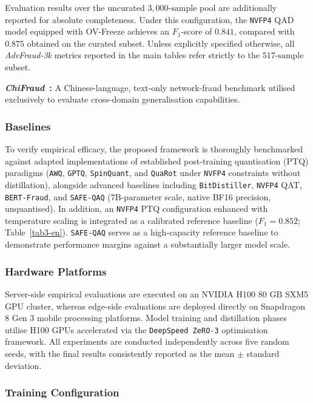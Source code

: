 \documentclass[a4paper,fleqn]{cas-sc}
\begin{document}
Evaluation results over the uncurated $3{,}000\text{-sample}$ pool are additionally reported for absolute completeness. Under this configuration, the \texttt{NVFP4} QAD model equipped with OV-Freeze achieves an $F_1$-score of $0.841$, compared with $0.875$ obtained on the curated subset. Unless explicitly specified otherwise, all \textit{AdvFraud-3k} metrics reported in the main tables refer strictly to the $517\text{-sample}$ subset.

\textbf{\textit{ChiFraud}~\citep{chifraud}:} A Chinese-language, text-only network-fraud benchmark utilised exclusively to evaluate cross-domain generalisation capabilities.

\subsubsection{Baselines}

To verify empirical efficacy, the proposed framework is thoroughly benchmarked against adapted implementations of established post-training quantisation (PTQ) paradigms (\texttt{AWQ}, \texttt{GPTQ}, \texttt{SpinQuant}, and \texttt{QuaRot} under \texttt{NVFP4} constraints without distillation), alongside advanced baselines including \texttt{BitDistiller}, \texttt{NVFP4} QAT, \texttt{BERT-Fraud}, and \texttt{SAFE-QAQ} ($7\text{B-parameter}$ scale, native BF16 precision, unquantised). In addition, an \texttt{NVFP4} PTQ configuration enhanced with temperature scaling is integrated as a calibrated reference baseline ($F_1 = 0.852$; Table~\ref{tab3-en}). \texttt{SAFE-QAQ} serves as a high-capacity reference baseline to demonstrate performance margins against a substantially larger model scale.

\subsubsection{Hardware Platforms}

Server-side empirical evaluations are executed on an NVIDIA H100 $80\text{~GB}$ SXM5 GPU cluster, whereas edge-side evaluations are deployed directly on Snapdragon 8 Gen 3 mobile processing platforms. Model training and distillation phases utilise H100 GPUs accelerated via the \texttt{DeepSpeed ZeRO-3} optimisation framework. All experiments are conducted independently across five random seeds, with the final results consistently reported as the mean $\pm$ standard deviation.

\subsubsection{Training Configuration}
\end{document}
